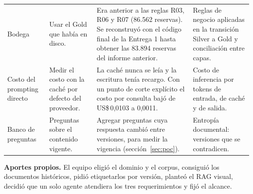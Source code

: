 \documentclass[11pt,letterpaper]{article}
\begin{document}
\begin{table}[H]
\begin{tabularx}{\textwidth}{>{\raggedright\arraybackslash}p{}>{\raggedright\arraybackslash}p{}LL}
Bodega & Usar el Gold que había en disco. & Era anterior a las reglas R03, R06 y R07 (86.562 reservas). Se reconstruyó con el código final de la Entrega 1 hasta obtener las 83.894 reservas del informe anterior. & Reglas de negocio aplicadas en la transición Silver a Gold y conciliación entre capas. \\
Costo del prompting directo & Medir el costo con la caché por defecto del proveedor. & La caché nunca se leía y la escritura tenía recargo. Con un punto de corte explícito el costo por consulta bajó de US\$\,0,0103 a 0,0011. & Costo de inferencia por tokens de entrada, de caché y de salida. \\
Banco de preguntas & Preguntas sobre el contenido vigente. & Agregar preguntas cuya respuesta cambió entre versiones, para medir la vigencia (sección~\ref{sec:poc}). & Entropía documental: versiones que se contradicen. \\
\bottomrule
\end{tabularx}
\end{table}

\textbf{Aportes propios.} El equipo eligió el dominio y el corpus, consiguió los documentos históricos, pidió etiquetarlos por versión, planteó el RAG visual, decidió que un solo agente atendiera los tres requerimientos y fijó el alcance.
\end{document}
